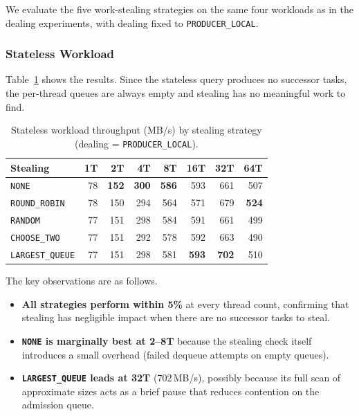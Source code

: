 We evaluate the five work-stealing strategies on the same four workloads as in the dealing experiments, with dealing fixed to \texttt{PRODUCER\_LOCAL}.

\subsubsection{Stateless Workload}

Table~\ref{tab:ws-stateless} shows the results. Since the stateless query produces no successor tasks, the per-thread queues are always empty and stealing has no meaningful work to find.

\begin{table}[h]
\centering
\caption{Stateless workload throughput (MB/s) by stealing strategy (dealing = \texttt{PRODUCER\_LOCAL}).}
\label{tab:ws-stateless}
\begin{tabular}{l|rrrrrrr}
\hline
\textbf{Stealing} & \textbf{1T} & \textbf{2T} & \textbf{4T} & \textbf{8T} & \textbf{16T} & \textbf{32T} & \textbf{64T} \\
\hline
\texttt{NONE}          & 78 & \textbf{152} & \textbf{300} & \textbf{586} & 593 & 661 & 507 \\
\texttt{ROUND\_ROBIN}  & 78 & 150 & 294 & 564 & 571 & 679 & \textbf{524} \\
\texttt{RANDOM}        & 77 & 151 & 298 & 584 & 591 & 661 & 499 \\
\texttt{CHOOSE\_TWO}   & 77 & 151 & 292 & 578 & 592 & 663 & 490 \\
\texttt{LARGEST\_QUEUE}& 77 & 151 & 298 & 581 & \textbf{593} & \textbf{702} & 510 \\
\hline
\end{tabular}
\end{table}

The key observations are as follows.
%
\begin{itemize}
    \item \textbf{All strategies perform within 5\%} at every thread count, confirming that stealing has negligible impact when there are no successor tasks to steal.
    \item \textbf{\texttt{NONE} is marginally best at 2--8T} because the stealing check itself introduces a small overhead (failed dequeue attempts on empty queues).
    \item \textbf{\texttt{LARGEST\_QUEUE} leads at 32T} (702\,MB/s), possibly because its full scan of approximate sizes acts as a brief pause that reduces contention on the admission queue.
\end{itemize}

